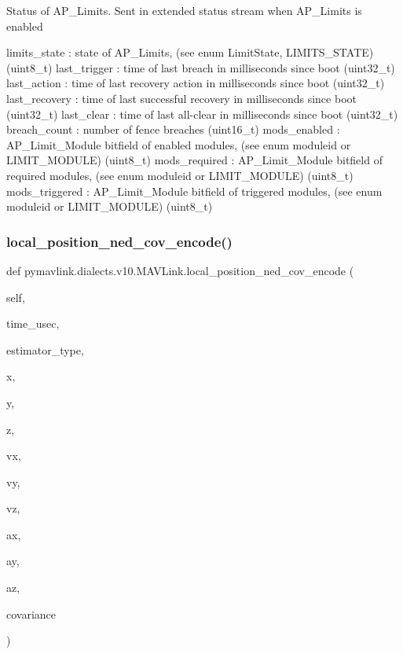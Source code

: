 \begin{DoxyVerb}
\begin{DoxyVerb}
\begin{DoxyVerb}
\begin{DoxyVerb}
\begin{DoxyVerb}Status of AP_Limits. Sent in extended status stream when AP_Limits is
enabled

limits_state              : state of AP_Limits, (see enum LimitState, LIMITS_STATE) (uint8_t)
last_trigger              : time of last breach in milliseconds since boot (uint32_t)
last_action               : time of last recovery action in milliseconds since boot (uint32_t)
last_recovery             : time of last successful recovery in milliseconds since boot (uint32_t)
last_clear                : time of last all-clear in milliseconds since boot (uint32_t)
breach_count              : number of fence breaches (uint16_t)
mods_enabled              : AP_Limit_Module bitfield of enabled modules, (see enum moduleid or LIMIT_MODULE) (uint8_t)
mods_required             : AP_Limit_Module bitfield of required modules, (see enum moduleid or LIMIT_MODULE) (uint8_t)
mods_triggered            : AP_Limit_Module bitfield of triggered modules, (see enum moduleid or LIMIT_MODULE) (uint8_t)\end{DoxyVerb}
 \mbox{\label{classpymavlink_1_1dialects_1_1v10_1_1MAVLink_a35978715abfebd4de0108ce6464485fb}} 
\subsubsection{\texorpdfstring{local\+\_\+position\+\_\+ned\+\_\+cov\+\_\+encode()}{local\_position\_ned\_cov\_encode()}}
{\footnotesize\ttfamily def pymavlink.\+dialects.\+v10.\+M\+A\+V\+Link.\+local\+\_\+position\+\_\+ned\+\_\+cov\+\_\+encode (\begin{DoxyParamCaption}\item[{}]{self,  }\item[{}]{time\+\_\+usec,  }\item[{}]{estimator\+\_\+type,  }\item[{}]{x,  }\item[{}]{y,  }\item[{}]{z,  }\item[{}]{vx,  }\item[{}]{vy,  }\item[{}]{vz,  }\item[{}]{ax,  }\item[{}]{ay,  }\item[{}]{az,  }\item[{}]{covariance }\end{DoxyParamCaption})}


\end{DoxyVerb}
\end{DoxyVerb}
\end{DoxyVerb}
\end{DoxyVerb}
